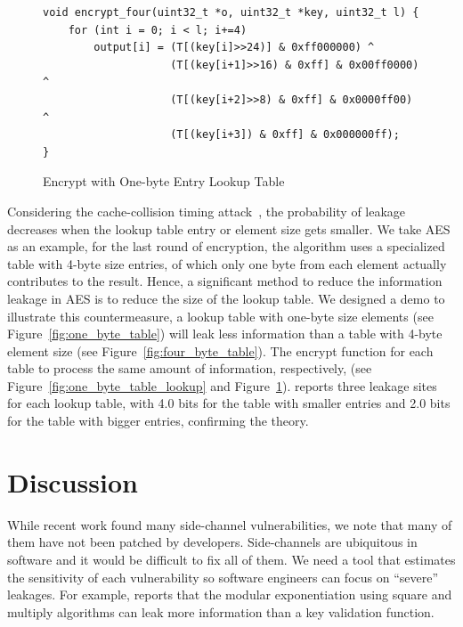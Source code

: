 \begin{figure}[h!]
    \centering
    \begin{lstlisting}[xleftmargin=.02\textwidth,xrightmargin=.01\textwidth]
void encrypt_four(uint32_t *o, uint32_t *key, uint32_t l) {
    for (int i = 0; i < l; i+=4)
        output[i] = (T[(key[i]>>24)] & 0xff000000) ^
                    (T[(key[i+1]>>16) & 0xff] & 0x00ff0000) ^
                    (T[(key[i+2]>>8) & 0xff] & 0x0000ff00) ^
                    (T[(key[i+3]) & 0xff] & 0x000000ff);
}
    \end{lstlisting}
    \caption{Encrypt with One-byte Entry Lookup Table}
    \label{fig:four_byte_table_lookup}
\end{figure}


Considering the cache-collision timing attack~\cite{Bonneau11894063_16}, the
probability of leakage decreases when the lookup table entry or element size gets
smaller. We take AES as an example, for the last round of encryption, the algorithm
uses a specialized table with 4-byte size entries, of which only one
byte from each element actually contributes to the result. Hence, a significant method to reduce
the information leakage in AES is to reduce the size of the lookup table. We
designed a demo to illustrate this countermeasure, a lookup table with one-byte
size elements (see Figure~\ref{fig:one_byte_table}) will leak less information
than a table with 4-byte element size (see Figure~\ref{fig:four_byte_table}). 
The encrypt function for each table to process the same amount of information, 
respectively, (see Figure~\ref{fig:one_byte_table_lookup} and
Figure~\ref{fig:four_byte_table_lookup}).  \tool{} reports three leakage sites for
each lookup table, with 4.0 bits for the table with smaller entries and 2.0
bits for the table with bigger entries, confirming the theory.

\section{Discussion}
While recent work found many side-channel vulnerabilities,
we note that many of them have not been patched by developers.
Side-channels are ubiquitous in software and it would be difficult to fix all of them.
We need a tool that estimates the sensitivity of each vulnerability
so software engineers can focus on
``severe'' leakages. For example, \tool{} reports that
the modular exponentiation using square and multiply algorithms can
leak more information than a key validation function.

